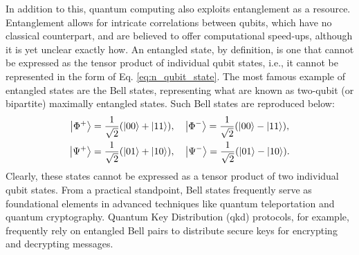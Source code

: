 In addition to this, quantum computing also exploits entanglement as a resource. Entanglement allows for intricate correlations between qubits, which have no classical counterpart, and are believed to offer computational speed-ups, although it is yet unclear exactly how. An entangled state, by definition, is one that cannot be expressed as the tensor product of individual qubit states, i.e., it cannot be represented in the form of Eq. \ref{eq:n_qubit_state}. The most famous example of entangled states are the Bell states, representing what are known as two-qubit (or bipartite) maximally entangled states. Such Bell states are reproduced below:
\begin{equation} %
  \begin{aligned}
  \ket{\Phi^+} &= \frac{1}{\sqrt{2}}(\ket{00} + \ket{11}), \quad
  \ket{\Phi^-} = \frac{1}{\sqrt{2}}(\ket{00} - \ket{11}), \\
  \ket{\Psi^+} &= \frac{1}{\sqrt{2}}(\ket{01} + \ket{10}), \quad
  \ket{\Psi^-} = \frac{1}{\sqrt{2}}(\ket{01} - \ket{10}).
  \end{aligned}
\end{equation}
Clearly, these states cannot be expressed as a tensor product of two individual qubit states. From a practical standpoint, Bell states frequently serve as foundational elements in advanced techniques like quantum teleportation and quantum cryptography. Quantum Key Distribution (\acrshort{qkd}) protocols, for example, frequently rely on entangled Bell pairs to distribute secure keys for encrypting and decrypting messages.

